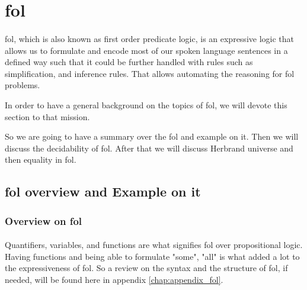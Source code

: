 \section{\acf{fol}} \label{sec:c2s1}

\paragraph{}
\ac{fol}, which is also known as first order predicate logic, is an expressive logic that allows us to formulate and encode most of our spoken language sentences in a defined way such that it could be further handled with rules such as simplification, and inference rules. That allows automating the reasoning for \ac{fol} problems.


In order to have a general background on the topics of \ac{fol}, we will devote this section to that mission. \begin{comment}
So we are going to discuss the following points:
	
	\begin{itemize}
		\item Summary over \ac{fol} and Example on using it
		\item Decidability of \ac{fol}
		\item Herbrand Universe
		\item Equality
	\end{itemize}	    
\end{comment}
So we are going to have a summary over the \ac{fol} and example on it. Then we will discuss the decidability of \ac{fol}. After that we will discuss Herbrand universe and then equality in \ac{fol}.	
	
	
\subsection{\ac{fol} overview and Example on it}

	\subsubsection{Overview on \ac{fol}}
	\paragraph{}
	Quantifiers, variables, and functions are what signifies \ac{fol} over propositional logic. Having functions and being able to formulate "some", "all" is what added a lot to the expressiveness of \ac{fol}. So a review on the syntax and the structure of \ac{fol}, if needed, will be found here in appendix \ref{chap:appendix_fol}.


